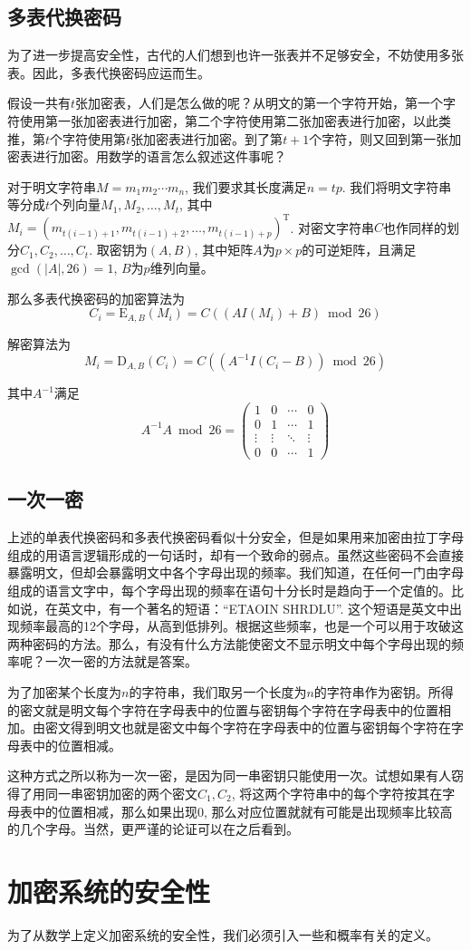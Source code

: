 \documentclass[UTF8]{ctexrep}
\def\abs#1{\left| #1 \right|}
\def\pth#1{\left( {#1}\right)}
\def\E#1#2{{\mathrm{E}_{#1}\left({#2}\right)}}
\def\D#1#2{{\mathrm{D}_{#1}\left({#2}\right)}}
\begin{document}
\subsection{多表代换密码}
为了进一步提高安全性，古代的人们想到也许一张表并不足够安全，不妨使用多张表。因此，多表代换密码应运而生。\par
假设一共有$t$张加密表，人们是怎么做的呢？从明文的第一个字符开始，第一个字符使用第一张加密表进行加密，第二个字符使用第二张加密表进行加密，以此类推，第$t$个字符使用第$t$张加密表进行加密。到了第$t+1$个字符，则又回到第一张加密表进行加密。用数学的语言怎么叙述这件事呢？\par
对于明文字符串$M=m_1m_2\cdots m_n$, 我们要求其长度满足$n=tp$. 我们将明文字符串等分成$t$个列向量$M_1, M_2, \ldots, M_t$, 其中$M_i=\pth{m_{t(i-1)+1}, m_{t(i-1)+2}, \ldots, m_{t(i-1)+p}}^{\mathrm{T}}$. 对密文字符串$C$也作同样的划分$C_1, C_2, \ldots, C_t$. 取密钥为$\pth{A, B}$, 其中矩阵$A$为$p\times p$的可逆矩阵，且满足$\gcd\pth{\abs{A}, 26}=1$, $B$为$p$维列向量。\par
那么多表代换密码的加密算法为
\begin{equation}
    C_i=\E{A, B}{M_i}=C\pth{\pth{AI\pth{M_i}+B}\bmod{26}}
\end{equation}

解密算法为
\begin{equation}
    M_i=\D{A, B}{C_i}=C\pth{\pth{A^{-1}I\pth{C_i-B}}\bmod{26}}
\end{equation}

其中$A^{-1}$满足
\[A^{-1}A\bmod{26}=\pth{\begin{array}{cccc}1&0&\cdots &0\\0&1&\cdots&1\\\vdots&\vdots&\ddots &\vdots\\0&0&\cdots&1\end{array}}\]
\subsection{一次一密}
上述的单表代换密码和多表代换密码看似十分安全，但是如果用来加密由拉丁字母组成的用语言逻辑形成的一句话时，却有一个致命的弱点。虽然这些密码不会直接暴露明文，但却会暴露明文中各个字母出现的频率。我们知道，在任何一门由字母组成的语言文字中，每个字母出现的频率在语句十分长时是趋向于一个定值的。比如说，在英文中，有一个著名的短语：``ETAOIN SHRDLU''. 这个短语是英文中出现频率最高的12个字母，从高到低排列。根据这些频率，也是一个可以用于攻破这两种密码的方法。那么，有没有什么方法能使密文不显示明文中每个字母出现的频率呢？一次一密的方法就是答案。\par
为了加密某个长度为$n$的字符串，我们取另一个长度为$n$的字符串作为密钥。所得的密文就是明文每个字符在字母表中的位置与密钥每个字符在字母表中的位置相加。由密文得到明文也就是密文中每个字符在字母表中的位置与密钥每个字符在字母表中的位置相减。\par
这种方式之所以称为一次一密，是因为同一串密钥只能使用一次。试想如果有人窃得了用同一串密钥加密的两个密文$C_1, C_2$, 将这两个字符串中的每个字符按其在字母表中的位置相减，那么如果出现$0$, 那么对应位置就就有可能是出现频率比较高的几个字母。当然，更严谨的论证可以在之后看到。
\section{加密系统的安全性}
为了从数学上定义加密系统的安全性，我们必须引入一些和概率有关的定义。
\end{document}
